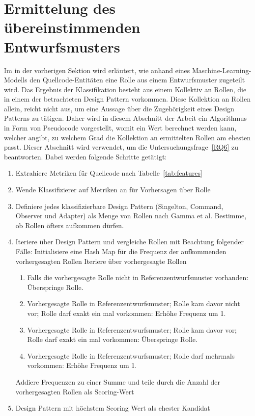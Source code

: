 \section{Ermittelung des übereinstimmenden Entwurfsmusters}\label{pattern}

Im in der vorherigen Sektion wird erläutert, wie anhand eines Maschine-Learning-Modells den Quellcode-Entitäten eine Rolle aus einem Entwurfsmuster zugeteilt wird.
Das Ergebnis der Klassifikation besteht aus einem Kollektiv an Rollen, die in einem der betrachteten Design Pattern vorkommen. Diese Kollektion an Rollen allein, reicht nicht aus, um eine Aussage über die Zugehörigkeit eines Design Patterns zu tätigen.
Daher wird in diesem Abschnitt der Arbeit ein Algorithmus in Form von Pseudocode vorgestellt, womit ein Wert berechnet werden kann, welcher angibt, zu welchem Grad die Kollektion an ermittelten Rollen am ehesten passt.
Dieser Abschnitt wird verwendet, um die Untersuchungsfrage~\ref{RQ6} zu beantworten. Dabei werden folgende Schritte getätigt:

\begin{enumerate}
    \item Extrahiere Metriken für Quellcode nach Tabelle~\ref{tab:features}
    \item Wende Klassifizierer auf Metriken an für Vorhersagen über Rolle
    \item Definiere jedes klassifizierbare Design Pattern (Singelton, Command, Observer und Adapter) als Menge von Rollen nach Gamma et al. Bestimme, ob Rollen öfters aufkommen dürfen.
    \item Iteriere über Design Pattern und vergleiche Rollen mit Beachtung folgender Fälle:
        \subitem Initialisiere eine Hash Map für die Frequenz der aufkommenden vorhergesagten Rollen
        \subitem Iteriere über vorhergesagte Rollen
        \begin{enumerate}
            \item Falls die vorhergesagte Rolle nicht in Referenzentwurfsmuster vorhanden: Überspringe Rolle.
            \item Vorhergesagte Rolle in Referenzentwurfsmuster; Rolle kam davor nicht vor; Rolle darf exakt ein mal vorkommen: Erhöhe Frequenz um 1.
            \item Vorhergesagte Rolle in Referenzentwurfsmuster; Rolle kam davor vor; Rolle darf exakt ein mal vorkommen: Überspringe Rolle.
            \item Vorhergesagte Rolle in Referenzentwurfsmuster; Rolle darf mehrmals vorkommen: Erhöhe Frequenz um 1.
        \end{enumerate}
        \subitem Addiere Frequenzen zu einer Summe und teile durch die Anzahl der vorhergesagten Rollen als Scoring-Wert
     \item Design Pattern mit höchstem Scoring Wert als ehester Kandidat
\end{enumerate}